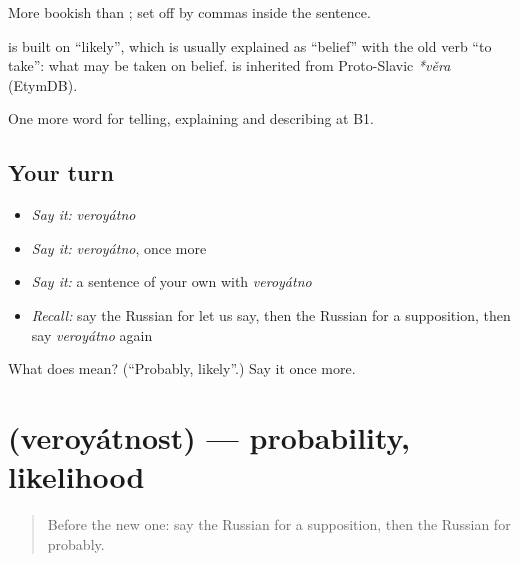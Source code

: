More bookish than \emph{}; set off by commas inside the sentence.

\begin{cousinweb}
\textbf{} is built on \emph{} \textquotedblleft{}likely\textquotedblright{}, which is usually explained as \emph{} \textquotedblleft{}belief\textquotedblright{} with the old verb \emph{} \textquotedblleft{}to take\textquotedblright{}: what may be taken on belief. \emph{} is inherited from Proto-Slavic \emph{*věra} (EtymDB).
\end{cousinweb}

\begin{grammarlens}[title={What you've built}]
One more word for telling, explaining and describing at B1.
\end{grammarlens}

\subsection*{Your turn}
\begin{itemize}
\raggedright
  \item \emph{Say it:} \emph{veroyátno}
  \item \emph{Say it:} \emph{veroyátno}, once more
  \item \emph{Say it:} a sentence of your own with \emph{veroyátno}
  \item \emph{Recall:} say the Russian for let us say, then the Russian for a supposition, then say \emph{veroyátno} again
\end{itemize}

\begin{tcolorbox}[breakable,colback=teal!4,colframe=teal!35!black,title={Before you move on}]
What does  mean? (\textquotedblleft{}Probably, likely\textquotedblright{}.) Say it once more.
\end{tcolorbox}
\section[\texorpdfstring{\ru{вероятность} (veroyátnost)}{вероятность (veroyátnost)}]{ (veroyátnost) — probability, likelihood}

\label{lesson:RU-C372-veroyatnost}



\begin{quote}
Before the new one: say the Russian for a supposition, then the Russian for probably.
\end{quote}

